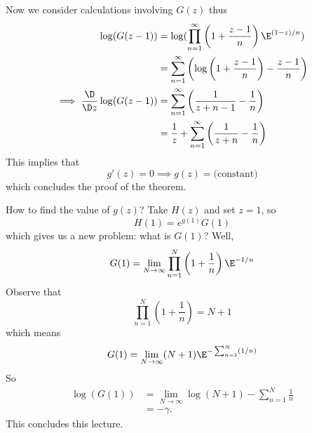 Now we consider calculations involving $G(z)$ thus
\begin{subequations}
\begin{align}
\log(G(z-1)) &=
\log(\prod^{\infty}_{n=1}\left(1+\frac{z-1}{n}\right)\E^{(1-z)/n})\\
&=\sum^{\infty}_{n=1}\left(\log\left(1+\frac{z-1}{n}\right)-\frac{z-1}{n}\right)\\
\implies\frac{\D}{\D z}\log(G(z-1)) &=
\sum^{\infty}_{n=1}\left(\frac{1}{z+n-1}-\frac{1}{n}\right)\\
&=
\frac{1}{z}+\sum^{\infty}_{n=1}\left(\frac{1}{z+n}-\frac{1}{n}\right)
\end{align}
\end{subequations}
This implies that
\begin{equation}
g'(z)=0\implies g(z)=\mbox{(constant)}
\end{equation}
which concludes the proof of the theorem.

How to find the value of $g(z)$? Take $H(z)$ and set $z=1$, so
\begin{equation}
H(1)=e^{g(1)}G(1)
\end{equation}
which gives us a new problem: what is $G(1)$? Well,
\begin{equation}
G(1)=\lim_{N\to\infty}\prod^{N}_{n=1}\left(1+\frac{1}{n}\right)\E^{-1/n}
\end{equation}
Observe that
\begin{equation}
\prod^{N}_{n=1}\left(1+\frac{1}{n}\right)=N+1
\end{equation}
which means
\begin{equation}
G(1)=\lim_{N\to\infty}(N+1)\E^{-\sum^{N}_{n=1}(1/n)}
\end{equation}
So
\begin{subequations}
\begin{align}
\log(G(1)) &=
\lim_{N\to\infty}\log(N+1)-\sum^{N}_{n=1}\frac{1}{n}\\
&=-\gamma.
\end{align}
\end{subequations}
This concludes this lecture.
